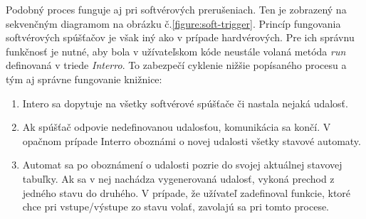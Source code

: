 Podobný proces funguje aj pri softvérových prerušeniach. Ten je zobrazený na sekvenčným diagramom na obrázku č.\ref{figure:soft-trigger}.
Princíp fungovania softvérových spúšťačov je však iný ako v prípade hardvérových. Pre ich správnu funkčnosť je nutné, aby bola v užívateľskom kóde neustále
volaná metóda \textit{run} definovaná v triede \textit{Interro}. To zabezpečí cyklenie nižšie popísaného procesu a tým aj správne fungovanie knižnice:

\begin{enumerate}
    \item Intero sa dopytuje na všetky softvérové spúšťače či nastala nejaká udalosť.
    \item Ak spúšťač odpovie nedefinovanou udalosťou, komunikácia sa končí. V opačnom prípade Interro oboznámi o novej udalosti všetky stavové automaty.
    \item Automat sa po oboznámení o udalosti pozrie do svojej aktuálnej stavovej tabuľky. Ak sa v nej nachádza vygenerovaná udalosť, vykoná prechod z jedného stavu do druhého.
          V prípade, že užívateľ zadefinoval funkcie, ktoré chce pri vstupe/výstupe zo stavu volať, zavolajú sa pri tomto procese.
\end{enumerate}

